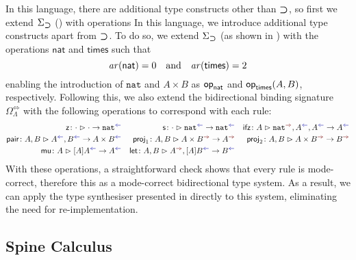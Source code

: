In this language, there are additional type constructs other than $\mathbin{\bm{\supset}}$, so first we extend $\Sigma_{\mathbin{\bm{\supset}}}$ () with operations
In this language, we introduce additional type constructs apart from $\mathbin{\bm{\supset}}$.
To do so, we extend $\Sigma_{\mathbin{\bm{\supset}}}$ (as shown in ) with the operations $\mathsf{nat}$ and $\mathsf{times}$ such that
\[
  \mathit{ar}({\mathsf{nat}}) = 0 \quad\text{and}\quad \mathit{ar}({\mathsf{times}}) = 2
\]
enabling the introduction of $\mathtt{nat}$ and $A \times B$ as $\mathsf{op}_{\mathsf{nat}}$ and $\mathsf{op}_{\mathsf{times}}(A, B)$, respectively.
Following this, we also extend the bidirectional binding signature $\Omega_{\Lambda}^{\Leftrightarrow}$ with the following operations to correspond with each rule:
\begin{align*}
  \aritysymbol{\mathsf{z}}{\cdot}{\cdot}{\mathtt{nat}^{\chk}}
  && \aritysymbol{\mathsf{s}}{\cdot}{\mathtt{nat}^{\chk}}{\mathtt{nat}^{\chk}}
  && \aritysymbol{\mathsf{ifz}}{A}{\mathtt{nat}^{\syn}, A^{\chk}, A^{\chk}}{A^{\chk}} \\
  \aritysymbol{\mathsf{pair}}{A, B}{A^{\chk}, B^{\chk}}{A \times B^{\chk}}
  && \aritysymbol{\mathsf{proj}_1}{A, B}{A \times B^{\syn}}{A^{\syn}}
  && \aritysymbol{\mathsf{proj}_2}{A, B}{A \times B^{\syn}}{B^{\syn}} \\
  \aritysymbol{\mathsf{mu}}{A}{[A]A^{\chk}}{A^{\chk}}
  && \aritysymbol{\mathsf{let}}{A, B}{A^{\syn},[A]B^{\chk}}{B^{\chk}}
\end{align*}
With these operations, a straightforward check shows that every rule is mode-correct, therefore this as a mode-correct bidirectional type system.
As a result, we can apply the type synthesiser presented in  directly to this system, eliminating the need for re-implementation.

\subsection{Spine Calculus}\label{subsec:spine}

